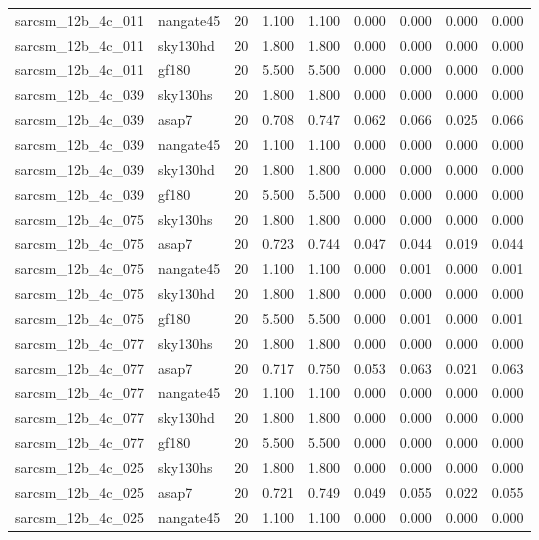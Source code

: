 \begin{tabular}{llrrrrrrr}
sarcsm\_12b\_4c\_011 & nangate45 & 20 & 1.100 & 1.100 & 0.000 & 0.000 & 0.000 & 0.000 \\
sarcsm\_12b\_4c\_011 & sky130hd & 20 & 1.800 & 1.800 & 0.000 & 0.000 & 0.000 & 0.000 \\
sarcsm\_12b\_4c\_011 & gf180 & 20 & 5.500 & 5.500 & 0.000 & 0.000 & 0.000 & 0.000 \\
sarcsm\_12b\_4c\_039 & sky130hs & 20 & 1.800 & 1.800 & 0.000 & 0.000 & 0.000 & 0.000 \\
sarcsm\_12b\_4c\_039 & asap7 & 20 & 0.708 & 0.747 & 0.062 & 0.066 & 0.025 & 0.066 \\
sarcsm\_12b\_4c\_039 & nangate45 & 20 & 1.100 & 1.100 & 0.000 & 0.000 & 0.000 & 0.000 \\
sarcsm\_12b\_4c\_039 & sky130hd & 20 & 1.800 & 1.800 & 0.000 & 0.000 & 0.000 & 0.000 \\
sarcsm\_12b\_4c\_039 & gf180 & 20 & 5.500 & 5.500 & 0.000 & 0.000 & 0.000 & 0.000 \\
sarcsm\_12b\_4c\_075 & sky130hs & 20 & 1.800 & 1.800 & 0.000 & 0.000 & 0.000 & 0.000 \\
sarcsm\_12b\_4c\_075 & asap7 & 20 & 0.723 & 0.744 & 0.047 & 0.044 & 0.019 & 0.044 \\
sarcsm\_12b\_4c\_075 & nangate45 & 20 & 1.100 & 1.100 & 0.000 & 0.001 & 0.000 & 0.001 \\
sarcsm\_12b\_4c\_075 & sky130hd & 20 & 1.800 & 1.800 & 0.000 & 0.000 & 0.000 & 0.000 \\
sarcsm\_12b\_4c\_075 & gf180 & 20 & 5.500 & 5.500 & 0.000 & 0.001 & 0.000 & 0.001 \\
sarcsm\_12b\_4c\_077 & sky130hs & 20 & 1.800 & 1.800 & 0.000 & 0.000 & 0.000 & 0.000 \\
sarcsm\_12b\_4c\_077 & asap7 & 20 & 0.717 & 0.750 & 0.053 & 0.063 & 0.021 & 0.063 \\
sarcsm\_12b\_4c\_077 & nangate45 & 20 & 1.100 & 1.100 & 0.000 & 0.000 & 0.000 & 0.000 \\
sarcsm\_12b\_4c\_077 & sky130hd & 20 & 1.800 & 1.800 & 0.000 & 0.000 & 0.000 & 0.000 \\
sarcsm\_12b\_4c\_077 & gf180 & 20 & 5.500 & 5.500 & 0.000 & 0.000 & 0.000 & 0.000 \\
sarcsm\_12b\_4c\_025 & sky130hs & 20 & 1.800 & 1.800 & 0.000 & 0.000 & 0.000 & 0.000 \\
sarcsm\_12b\_4c\_025 & asap7 & 20 & 0.721 & 0.749 & 0.049 & 0.055 & 0.022 & 0.055 \\
sarcsm\_12b\_4c\_025 & nangate45 & 20 & 1.100 & 1.100 & 0.000 & 0.000 & 0.000 & 0.000 \\

\end{tabular}
